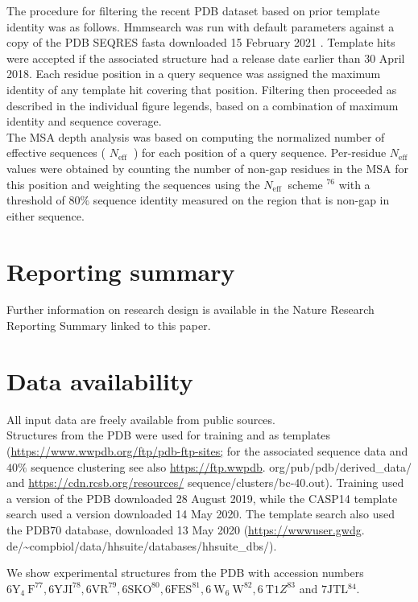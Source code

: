 \documentclass[10pt]{article}
\begin{document}
The procedure for filtering the recent PDB dataset based on prior template identity was as follows. Hmmsearch was run with default parameters against a copy of the PDB SEQRES fasta downloaded 15 February 2021 . Template hits were accepted if the associated structure had a release date earlier than 30 April 2018. Each residue position in a query sequence was assigned the maximum identity of any template hit covering that position. Filtering then proceeded as described in the individual figure legends, based on a combination of maximum identity and sequence coverage.\\
The MSA depth analysis was based on computing the normalized number of effective sequences ( $N_{\text {eff }}$ ) for each position of a query sequence. Per-residue $N_{\text {eff }}$ values were obtained by counting the number of non-gap residues in the MSA for this position and weighting the sequences using the $N_{\text {eff }}$ scheme ${ }^{76}$ with a threshold of $80 \%$ sequence identity measured on the region that is non-gap in either sequence.

\section*{Reporting summary}
Further information on research design is available in the Nature Research Reporting Summary linked to this paper.

\section*{Data availability}
All input data are freely available from public sources.\\
Structures from the PDB were used for training and as templates (\href{https://www.wwpdb.org/ftp/pdb-ftp-sites;}{https://www.wwpdb.org/ftp/pdb-ftp-sites;} for the associated sequence data and $40 \%$ sequence clustering see also \href{https://ftp.wwpdb}{https://ftp.wwpdb}. org/pub/pdb/derived\_data/ and \href{https://cdn.rcsb.org/resources/}{https://cdn.rcsb.org/resources/} sequence/clusters/bc-40.out). Training used a version of the PDB downloaded 28 August 2019, while the CASP14 template search used a version downloaded 14 May 2020. The template search also used the PDB70 database, downloaded 13 May 2020 (\href{https://wwwuser.gwdg}{https://wwwuser.gwdg}. de/\~{}compbiol/data/hhsuite/databases/hhsuite\_dbs/).

We show experimental structures from the PDB with accession numbers $6 \mathrm{Y}_{4} \mathrm{~F}^{77}, 6 \mathrm{YJI}^{78}, 6 \mathrm{VR}^{79}, 6 \mathrm{SKO}^{80}, 6 \mathrm{FES}^{81}, 6 \mathrm{~W}_{6} \mathrm{~W}^{82}, 6 \mathrm{~T} 1 Z^{83}$ and $7 \mathrm{JTL}{ }^{84}$.
\end{document}

